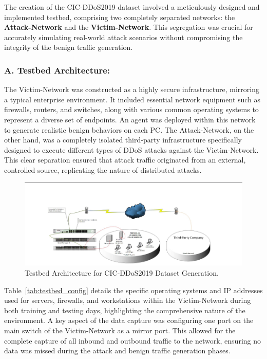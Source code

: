 \documentclass[12pt]{report}
\begin{document}
The creation of the CIC-DDoS2019 dataset involved a meticulously designed and implemented testbed, comprising two completely separated networks: the \textbf{Attack-Network} and the \textbf{Victim-Network}. This segregation was crucial for accurately simulating real-world attack scenarios without compromising the integrity of the benign traffic generation.

\subsubsection{A. Testbed Architecture:}

The Victim-Network was constructed as a highly secure infrastructure, mirroring a typical enterprise environment. It included essential network equipment such as firewalls, routers, and switches, along with various common operating systems to represent a diverse set of endpoints. An agent was deployed within this network to generate realistic benign behaviors on each PC. The Attack-Network, on the other hand, was a completely isolated third-party infrastructure specifically designed to execute different types of DDoS attacks against the Victim-Network. This clear separation ensured that attack traffic originated from an external, controlled source, replicating the nature of distributed attacks.

\begin{figure}[htbp]
\centering
\includegraphics[width=\textwidth]{images/testbed_architecture.png} %
\caption{Testbed Architecture for CIC-DDoS2019 Dataset Generation.}
\label{fig:testbed_architecture}
\end{figure}

Table~\ref{tab:testbed_config} details the specific operating systems and IP addresses used for servers, firewalls, and workstations within the Victim-Network during both training and testing days, highlighting the comprehensive nature of the environment. A key aspect of the data capture was configuring one port on the main switch of the Victim-Network as a mirror port. This allowed for the complete capture of all inbound and outbound traffic to the network, ensuring no data was missed during the attack and benign traffic generation phases.
\end{document}
